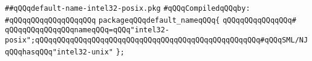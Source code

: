 \label{src/app/c-glue-maker/default-name-intel32-posix.pkg}
\verb|##qQQqdefault-name-intel32-posix.pkg|\newline
\newline
\verb|#qQQqCompiledqQQqby:|\newline
\verb|#qQQqqQQqqQQqqQQqqQQq|\newline
\newline
\verb|packageqQQqdefault_nameqQQq{|\newline
\verb|qQQqqQQqqQQqqQQq#|\newline
\verb|qQQqqQQqqQQqqQQqnameqQQq=qQQq"intel32-posix";qQQqqQQqqQQqqQQqqQQqqQQqqQQqqQQqqQQqqQQqqQQqqQQqqQQq#qQQqSML/NJqQQqhasqQQq"intel32-unix"|\newline
\verb|};|\newline
\newline
\newline

